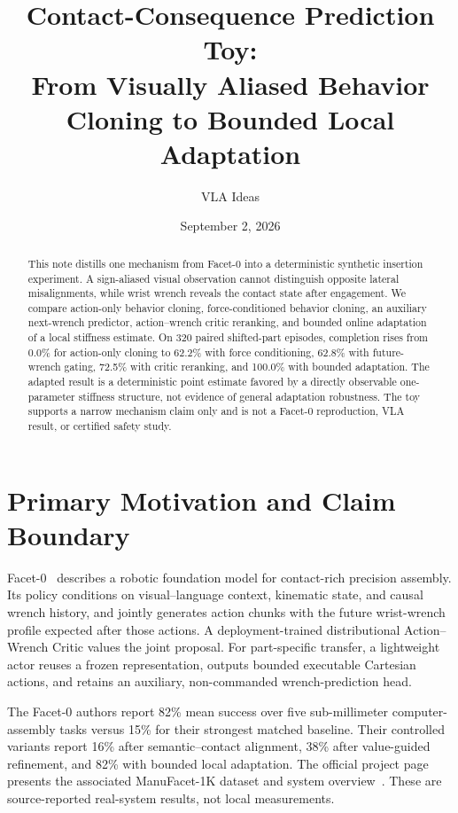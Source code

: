 \documentclass[11pt]{article}
\title{Contact-Consequence Prediction Toy:\\From Visually Aliased Behavior Cloning to Bounded Local Adaptation}
\author{VLA Ideas}
\date{September 2, 2026}
\begin{document}
\maketitle

\begin{abstract}
This note distills one mechanism from Facet-0 into a deterministic synthetic insertion experiment. A sign-aliased visual observation cannot distinguish opposite lateral misalignments, while wrist wrench reveals the contact state after engagement. We compare action-only behavior cloning, force-conditioned behavior cloning, an auxiliary next-wrench predictor, action--wrench critic reranking, and bounded online adaptation of a local stiffness estimate. On 320 paired shifted-part episodes, completion rises from 0.0\% for action-only cloning to 62.2\% with force conditioning, 62.8\% with future-wrench gating, 72.5\% with critic reranking, and 100.0\% with bounded adaptation. The adapted result is a deterministic point estimate favored by a directly observable one-parameter stiffness structure, not evidence of general adaptation robustness. The toy supports a narrow mechanism claim only and is not a Facet-0 reproduction, VLA result, or certified safety study.
\end{abstract}

\section{Primary Motivation and Claim Boundary}
Facet-0~\cite{facet0} describes a robotic foundation model for contact-rich precision assembly. Its policy conditions on visual--language context, kinematic state, and causal wrench history, and jointly generates action chunks with the future wrist-wrench profile expected after those actions. A deployment-trained distributional Action--Wrench Critic values the joint proposal. For part-specific transfer, a lightweight actor reuses a frozen representation, outputs bounded executable Cartesian actions, and retains an auxiliary, non-commanded wrench-prediction head.

The Facet-0 authors report 82\% mean success over five sub-millimeter computer-assembly tasks versus 15\% for their strongest matched baseline. Their controlled variants report 16\% after semantic--contact alignment, 38\% after value-guided refinement, and 82\% with bounded local adaptation. The official project page presents the associated ManuFacet-1K dataset and system overview~\cite{facetproject}. These are source-reported real-system results, not local measurements.
\end{document}
